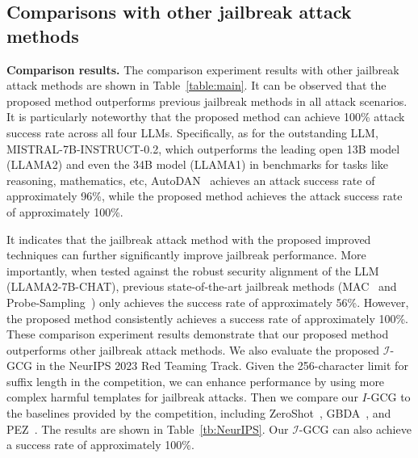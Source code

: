 \subsection{Comparisons with other jailbreak attack methods}
\noindent\textbf{Comparison results.}  The comparison experiment results with other jailbreak attack methods are shown in
Table~\ref{table:main}. It can
be observed that the proposed method outperforms previous jailbreak methods in all attack scenarios.  
It is particularly noteworthy that the proposed method can achieve 100\% attack success rate across all four LLMs. Specifically, as for the outstanding LLM, MISTRAL-7B-INSTRUCT-0.2, which outperforms the leading open 13B model (LLAMA2) and even the 34B model (LLAMA1) in benchmarks for tasks like reasoning, mathematics, etc, AutoDAN~\cite{liu2023autodan} achieves an attack success rate of approximately 96\%, while the proposed method achieves the attack success rate of approximately 100\%. 

It indicates that the jailbreak attack method with the proposed improved techniques can further significantly improve jailbreak performance. More importantly, when tested against the robust security alignment of the LLM (LLAMA2-7B-CHAT), previous state-of-the-art jailbreak methods (MAC~\cite{zhang2024boosting} and Probe-Sampling~\cite{zhao2024accelerating}) only achieves the success rate of approximately 56\%. However, the proposed method consistently achieves a success rate of approximately 100\%. These comparison experiment results demonstrate that our proposed method outperforms other jailbreak attack methods. We also evaluate the proposed $\mathcal{I}$-GCG in the NeurIPS 2023 Red Teaming Track. Given the 256-character limit for suffix length in the competition, we can enhance performance by using more complex harmful templates for jailbreak attacks. Then we compare our $I$-GCG to the baselines provided by the competition, including ZeroShot~\cite{perez2022red}, GBDA~\cite{guo2021gradient}, and PEZ~\cite{wen2024hard}. The results are shown in Table~\ref{tb:NeurIPS}. Our $\mathcal{I}$-GCG can also achieve a success rate of approximately  100\%. 

